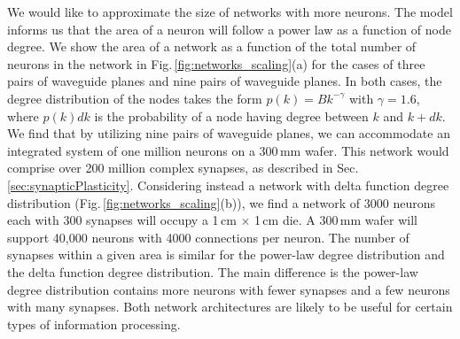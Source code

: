 \documentclass[aip,amsmath,amssymb,reprint,nofootinbib]{revtex4-1}
\begin{document}
We would like to approximate the size of networks with more neurons. The model informs us that the area of a neuron will follow a power law as a function of node degree. We show the area of a network as a function of the total number of neurons in the network in Fig.\,\ref{fig:networks_scaling}(a) for the cases of three pairs of waveguide planes and nine pairs of waveguide planes. In both cases, the degree distribution of the nodes takes the form $p(k) = Bk^{-\gamma}$ with $\gamma = 1.6$, where $p(k)dk$ is the probability of a node having degree between $k$ and $k+dk$. We find that by utilizing nine pairs of waveguide planes, we can accommodate an integrated system of one million neurons on a 300\,mm wafer. This network would comprise over 200 million complex synapses, as described in Sec.\,\ref{sec:synapticPlasticity}. Considering instead a network with delta function degree distribution (Fig.\,\ref{fig:networks_scaling}(b)), we find a network of 3000 neurons each with 300 synapses will occupy a 1\,cm $\times$ 1\,cm die. A 300\,mm wafer will support 40,000 neurons with 4000 connections per neuron. The number of synapses within a given area is similar for the power-law degree distribution and the delta function degree distribution. The main difference is the power-law degree distribution contains more neurons with fewer synapses and a few neurons with many synapses. Both network architectures are likely to be useful for certain types of information processing.
\end{document}
